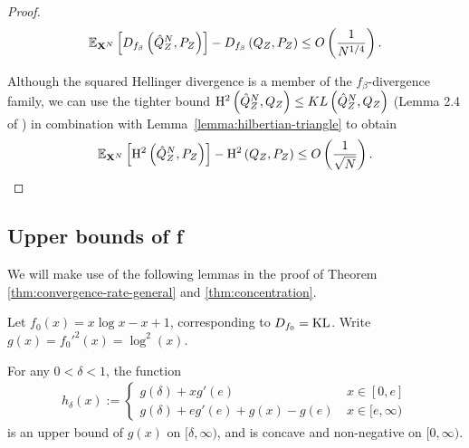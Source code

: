 \begin{proof}
\begin{align*}
    \mathbb{E}_{\mathbf{X}^N}\left[D_{f_\beta}\left( \hat{Q}^N_Z , P_Z\right)\right] - D_{f_\beta}\left( Q_{Z} , P_Z\right) \leq O\left(\frac{1}{N^{1/4}}\right).
\end{align*}

Although the squared Hellinger divergence is a member of the $f_\beta$-divergence family, we can use the tighter bound $\mathrm{H}^2\left( \hat{Q}^N_Z , Q_Z\right) \leq KL\left( \hat{Q}^N_Z , Q_Z\right)$ (Lemma 2.4 of \cite{tsybakov2009}) in combination with Lemma~\ref{lemma:hilbertian-triangle} to obtain
\begin{align*}
    \mathbb{E}_{\mathbf{X}^N}\left[\mathrm{H}^2\left( \hat{Q}^N_Z , P_Z\right)\right] - \mathrm{H}^2\left( Q_{Z} , P_Z\right) \leq O\left(\frac{1}{\sqrt{N}}\right).
\end{align*}
\end{proof}





\subsection{Upper bounds of f}\label{appendix:subsubsec:f-upper-bounds}

We will make use of the following lemmas in the proof of Theorem \ref{thm:convergence-rate-general} and \ref{thm:concentration}.

\begin{lemma}\label{lemma:concave-upper-bound-kl} 
Let $f_0(x)=x\log x - x +1$, corresponding to $D_{f_0} = \mathrm{KL}$.
Write $g(x) = f_0'^2(x) = \log^2(x)$.

For any $0< \delta < 1$, the function
\begin{align*}
    h_{\delta}(x) := \begin{cases} 
    g(\delta) + x g'(e) & \: x \in [0, e]\\
    g(\delta) + e g'(e) + g(x) - g(e) & \: x \in [e, \infty)
    \end{cases}
\end{align*}
is an upper bound of $g(x)$ on $[\delta, \infty)$, and is concave and non-negative on $[0, \infty)$.
\end{lemma}


